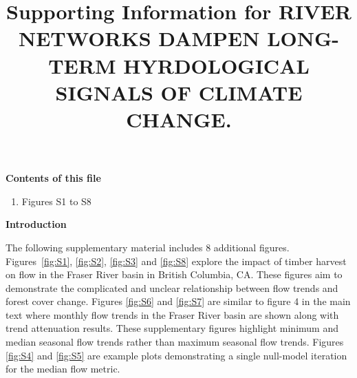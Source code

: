 \documentclass[draft,grl]{agutexSI}
\begin{document}


\title{Supporting Information for RIVER NETWORKS DAMPEN LONG-TERM HYRDOLOGICAL SIGNALS OF CLIMATE CHANGE.}





\begin{article}


\noindent\textbf{Contents of this file}

\begin{enumerate}
\item Figures S1 to S8
\end{enumerate}

\clearpage

\noindent\textbf{Introduction}

	The following supplementary material includes 8 additional figures. Figures~\ref{fig:S1}, \ref{fig:S2}, \ref{fig:S3} and \ref{fig:S8} explore the impact of timber harvest on flow in the Fraser River basin in British Columbia, CA. These figures aim to demonstrate the complicated and unclear relationship between flow trends and forest cover change. Figures \ref{fig:S6} and \ref{fig:S7} are similar to figure 4 in the main text where monthly flow trends in the Fraser River basin are shown along with trend attenuation results. These supplementary figures highlight minimum and median seasonal flow trends rather than maximum seasonal flow trends. Figures \ref{fig:S4} and \ref{fig:S5} are example plots demonstrating a single null-model iteration for the median flow metric.

\end{article}
\clearpage
\end{document}
